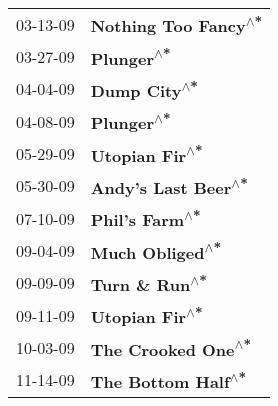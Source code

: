 \begin{supertabular}{p{0.25\columnwidth}p{0.75\columnwidth}}
 03-13-09 &  \textbf{Nothing Too Fancy\textsuperscript{$\wedge$*}} \\
 03-27-09 &            \textbf{Plunger\textsuperscript{$\wedge$*}} \\
 04-04-09 &          \textbf{Dump City\textsuperscript{$\wedge$*}} \\
 04-08-09 &            \textbf{Plunger\textsuperscript{$\wedge$*}} \\
 05-29-09 &        \textbf{Utopian Fir\textsuperscript{$\wedge$*}} \\
 05-30-09 &   \textbf{Andy's Last Beer\textsuperscript{$\wedge$*}} \\
 07-10-09 &        \textbf{Phil's Farm\textsuperscript{$\wedge$*}} \\
 09-04-09 &       \textbf{Much Obliged\textsuperscript{$\wedge$*}} \\
 09-09-09 &        \textbf{Turn \& Run\textsuperscript{$\wedge$*}} \\
 09-11-09 &        \textbf{Utopian Fir\textsuperscript{$\wedge$*}} \\
 10-03-09 &    \textbf{The Crooked One\textsuperscript{$\wedge$*}} \\
 11-14-09 &    \textbf{The Bottom Half\textsuperscript{$\wedge$*}} \\
\end{supertabular}
